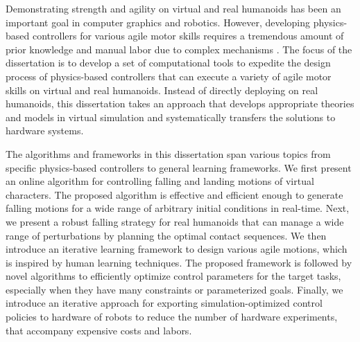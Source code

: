 
Demonstrating strength and agility on virtual and real humanoids has
been an important goal in computer graphics and robotics.
However, developing physics-based controllers for various agile motor skills
requires a tremendous amount of prior knowledge and manual labor due to
complex mechanisms .
The focus of the dissertation is to develop a set of computational tools to
expedite the design process of physics-based controllers that can execute a
variety of agile motor skills on virtual and real humanoids.
Instead of directly deploying  on real humanoids, this
dissertation takes an approach that develops appropriate theories and models in
virtual simulation and systematically transfers the solutions to hardware systems.

The algorithms and frameworks in this dissertation span various topics from
specific physics-based controllers to general learning frameworks.
We first present an online algorithm for controlling falling and landing
motions of virtual characters.
The proposed algorithm is effective and efficient enough to generate falling
motions for a wide range of arbitrary initial conditions in real-time.
Next, we present a robust falling strategy for real humanoids that can manage
a wide range of perturbations by planning the optimal contact sequences.
We then introduce an iterative learning framework to  design
various agile motions, which is inspired by human learning techniques.
The proposed framework is followed by novel algorithms to
efficiently optimize control parameters for the target tasks, especially when
they have many constraints or parameterized goals.
Finally, we introduce an iterative approach for exporting simulation-optimized
control policies to hardware of robots to reduce the number of hardware
experiments, that accompany expensive costs and labors.





